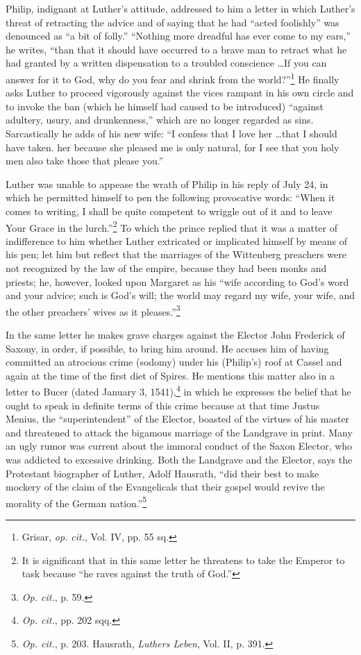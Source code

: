 Philip, indignant at Luther’s attitude, addressed to him a letter
in which Luther’s threat of retracting the advice and of saying that
he had “acted foolishly” was denounced as “a bit of folly.” “Nothing
more dreadful has ever come to my ears,” he writes, “than that it
should have occurred to a brave man to retract what he had granted
by a written dispensation to a troubled conscience \dots If you can
answer for it to God, why do you fear and shrink from the world?”\footnote
{Grisar, \textit{op. cit.}, Vol. IV, pp. 55 sq.}
He finally asks Luther to proceed vigorously against the vices rampant
in his own circle and to invoke the ban (which he himself had caused
to be introduced) “against adultery, usury, and drunkenness,” which
are no longer regarded as sins. Sarcastically he adds of his new wife:
“I confess that I love her \dots that I should have taken. her because
she pleased me is only natural, for I see that you holy men also take
those that please you.”

Luther was unable to appease the wrath of Philip in his reply of
July 24, in which he permitted himself to pen the following provocative
words: “When it comes to writing, I shall be quite competent to
wriggle out of it and to leave Your Grace in the lurch.”\footnote
{It is significant that in this same letter he threatens to take the Emperor to task because
“he raves against the truth of God.”}
To which
the prince replied that it was a matter of indifference to him whether
Luther extricated or implicated himself by means of his pen; let him
but reflect that the marriages of the Wittenberg preachers were not
recognized by the law of the empire, because they had been monks
and priests; he, however, looked upon Margaret as his “wife according
to God’s word and your advice; such is God’s will; the world
may regard my wife, your wife, and the other preachers’ wives as it
pleases.”\footnote{\textit{Op. cit.}, p. 59.}

In the same letter he makes grave charges against the Elector John
Frederick of Saxony, in order, if possible, to bring him around. He
accuses him of having committed an atrocious crime (sodomy) under
his (Philip’s) roof at Cassel and again at the time of the first diet
of Spires. He mentions this matter also in a letter to Bucer (dated
January 3, 1541),\footnote{\textit{Op. cit.}, pp. 202 sqq.}
 in which he expresses the belief that he ought
to speak in definite terms of this crime because at that time Justus
Menius, the “superintendent” of the Elector, boasted of the virtues
of his master and threatened to attack the bigamous marriage of the
Landgrave in print. Many an ugly rumor was current about the immoral conduct
of the Saxon Elector, who was addicted to excessive
drinking. Both the Landgrave and the Elector, says the Protestant
biographer of Luther, Adolf Hausrath, “did their best to make mockery
of the claim of the Evangelicals that their gospel would revive
the morality of the German nation.”\footnote{\textit{Op. cit.}, p. 203. Hausrath, \textit{Luthers Leben}, Vol. II, p. 391.}

